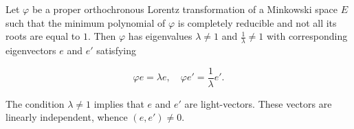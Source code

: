 Let $\varphi$ be a proper orthochronous Lorentz transformation of a Minkowski space $E$ such that the minimum polynomial of $\varphi$ is completely reducible and not all its roots are equal to $1$. Then $\varphi$ has eigenvalues $\lambda \neq 1$ and $\frac{1}{\lambda} \neq 1$ with corresponding eigenvectors $e$ and $e'$ satisfying

$$\varphi e = \lambda e, \quad \varphi e' = \frac{1}{\lambda} e'.$$

The condition $\lambda \neq 1$ implies that $e$ and $e'$ are light-vectors. These vectors are linearly independent, whence $(e, e') \neq 0$.
